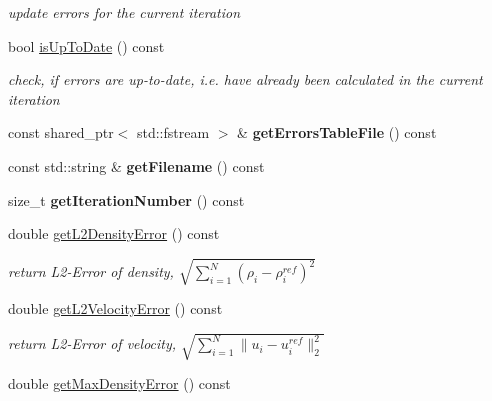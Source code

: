 \begin{DoxyCompactItemize}
\begin{DoxyCompactList}\small\item\em update errors for the current iteration \item\end{DoxyCompactList}\item 
\hypertarget{classnatrium_1_1ErrorStats_a72dcc0b8b86335a50ee1b324bbed0e61}{
bool \hyperlink{classnatrium_1_1ErrorStats_a72dcc0b8b86335a50ee1b324bbed0e61}{isUpToDate} () const }
\label{classnatrium_1_1ErrorStats_a72dcc0b8b86335a50ee1b324bbed0e61}

\begin{DoxyCompactList}\small\item\em check, if errors are up-\/to-\/date, i.e. have already been calculated in the current iteration \item\end{DoxyCompactList}\item 
\hypertarget{classnatrium_1_1ErrorStats_aebc5c3f92adfee93ece2f97275651e44}{
const shared\_\-ptr$<$ std::fstream $>$ \& {\bfseries getErrorsTableFile} () const }
\label{classnatrium_1_1ErrorStats_aebc5c3f92adfee93ece2f97275651e44}

\item 
\hypertarget{classnatrium_1_1ErrorStats_a341ef071a84aa3a2b78485ce90bca7b2}{
const std::string \& {\bfseries getFilename} () const }
\label{classnatrium_1_1ErrorStats_a341ef071a84aa3a2b78485ce90bca7b2}

\item 
\hypertarget{classnatrium_1_1ErrorStats_ab710182a15d0c548fbc8c3b071dbebd1}{
size\_\-t {\bfseries getIterationNumber} () const }
\label{classnatrium_1_1ErrorStats_ab710182a15d0c548fbc8c3b071dbebd1}

\item 
double \hyperlink{classnatrium_1_1ErrorStats_a66f817c7daaf15724d5d42de4f17a1e8}{getL2DensityError} () const 
\begin{DoxyCompactList}\small\item\em return L2-\/Error of density, $ \sqrt{ \sum_{i=1}^{N} (\rho_{i} - \rho_{i}^{ref})^{2} } $ \item\end{DoxyCompactList}\item 
double \hyperlink{classnatrium_1_1ErrorStats_a201f625a3607a814fdd645aabfe37fbc}{getL2VelocityError} () const 
\begin{DoxyCompactList}\small\item\em return L2-\/Error of velocity, $ \sqrt{ \sum_{i=1}^{N} \|u_{i} - u_{i}^{ref}\|_{2}^{2} } $ \item\end{DoxyCompactList}\item 
\hypertarget{classnatrium_1_1ErrorStats_a8e32b3e8c8d141b6cdcf5428613a875e}{
double \hyperlink{classnatrium_1_1ErrorStats_a8e32b3e8c8d141b6cdcf5428613a875e}{getMaxDensityError} () const }
\label{classnatrium_1_1ErrorStats_a8e32b3e8c8d141b6cdcf5428613a875e}


\end{DoxyCompactItemize}
